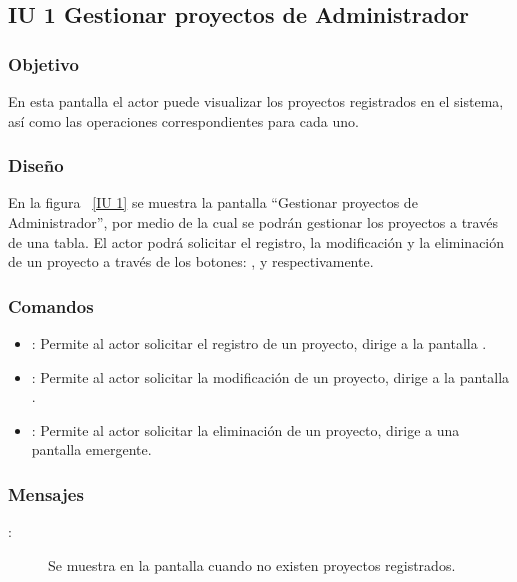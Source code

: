 \newpage 
\subsection{IU 1 Gestionar proyectos de Administrador}
\subsubsection{Objetivo}
	
	En esta pantalla el actor puede visualizar los proyectos registrados en el sistema, así como las operaciones correspondientes para cada uno.

\subsubsection{Diseño}

    En la figura ~\ref{IU 1} se muestra la pantalla ``Gestionar proyectos de Administrador'', por medio de la cual 
    se podrán gestionar los proyectos a través de una tabla. El actor podrá solicitar el registro, la modificación y la eliminación 
    de un proyecto a través de los botones: , \btnEditar y \btnEliminar respectivamente. \\
    


\subsubsection{Comandos}
\begin{itemize}
	\item {}: Permite al actor solicitar el registro de un proyecto, dirige a la pantalla .
	\item \btnEditar[Modificar]: Permite al actor solicitar la modificación de un proyecto, dirige a la pantalla .
	\item \btnEliminar[Eliminar]: Permite al actor solicitar la eliminación de un proyecto, dirige a una pantalla emergente.
\end{itemize}
\subsubsection{Mensajes}
	
\begin{description}
	\item[:] Se muestra en la pantalla  cuando no existen proyectos registrados.
\end{description}
